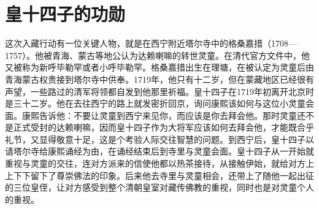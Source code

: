 \begin{sectionnotes}











\end{sectionnotes}
\section{皇十四子的功勋}


这次入藏行动有一位关键人物，就是在西宁附近塔尔寺中的格桑嘉措（1708—1757）。他被青海、蒙古等地公认为达赖喇嘛的转世灵童。在清代官方文件中，他又被称为新呼毕勒罕或者小呼毕勒罕。格桑嘉措出生在理塘，在被认定为灵童后由青海蒙古权贵接到塔尔寺中供奉。1719年，他只有十二岁，但在蒙藏地区已经很有声望，一些路过的清军将领都自发到他那里祈福。皇十四子在1719年初离开北京时是三十二岁。他在去往西宁的路上就发密折回京，询问康熙该如何与这位小灵童会面。康熙告诉他：不要让灵童到西宁来见你，而应该是你去拜会他。那时灵童还不是正式受封的达赖喇嘛，因而皇十四子作为大将军应该如何去拜会他，才能既合乎礼节，又显得敬意十足，这是个考验人际交往智慧的问题。到西宁后，皇十四子以请塔尔寺给康熙诵经为由，在诵经结束后到寺里与灵童会面。皇十四子从一开始就重视与灵童的交往，连对方派来的信使他都以热茶接待，从接触伊始，就给对方上上下下留下了尊崇佛法的印象。后来他去寺里与灵童相会，还带上了随他一起出征的三位皇侄，让对方感受到整个清朝皇室对藏传佛教的重视，同时也是对灵童个人的重视。


